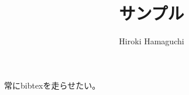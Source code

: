 \documentclass[a4paper,12pt]{jlreq}
\title{サンプル}
\author{Hiroki Hamaguchi}
\begin{document}
\maketitle

常にbibtexを走らせたい\cite{sample}。



\end{document}

